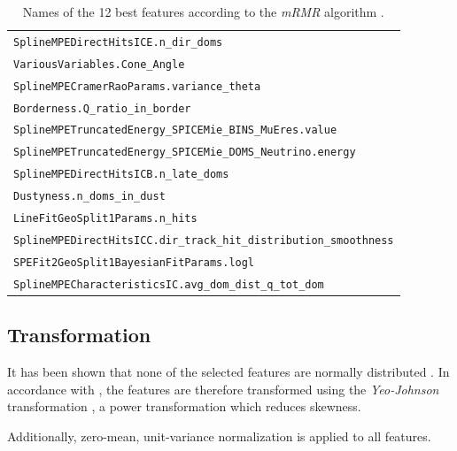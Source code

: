 \begin{table}
    \centering
    \caption{
      Names of the 12 best features according to the \emph{mRMR} algorithm \cite{dsea_jan}.
    }
    \label{tab:features_best}
    \begin{tabular}{l}
        \toprule
        \texttt{SplineMPEDirectHitsICE.n\_dir\_doms} \\
        \texttt{VariousVariables.Cone\_Angle} \\
        \texttt{SplineMPECramerRaoParams.variance\_theta} \\
        \texttt{Borderness.Q\_ratio\_in\_border} \\
        \texttt{SplineMPETruncatedEnergy\_SPICEMie\_BINS\_MuEres.value} \\
        \texttt{SplineMPETruncatedEnergy\_SPICEMie\_DOMS\_Neutrino.energy} \\
        \texttt{SplineMPEDirectHitsICB.n\_late\_doms} \\
        \texttt{Dustyness.n\_doms\_in\_dust} \\
        \texttt{LineFitGeoSplit1Params.n\_hits} \\
        \texttt{SplineMPEDirectHitsICC.dir\_track\_hit\_distribution\_smoothness} \\
        \texttt{SPEFit2GeoSplit1BayesianFitParams.logl} \\
        \texttt{SplineMPECharacteristicsIC.avg\_dom\_dist\_q\_tot\_dom} \\
        \bottomrule
    \end{tabular}
\end{table}


\subsection{Transformation}
It has been shown that none of the selected features are normally distributed \cite{dsea_jan}.
In accordance with \cite{dsea_jan},
the features are therefore transformed using the \emph{Yeo-Johnson} transformation \cite{yeo_johnson},
a power transformation which reduces skewness.

Additionally, zero-mean, unit-variance normalization is applied to all features.


